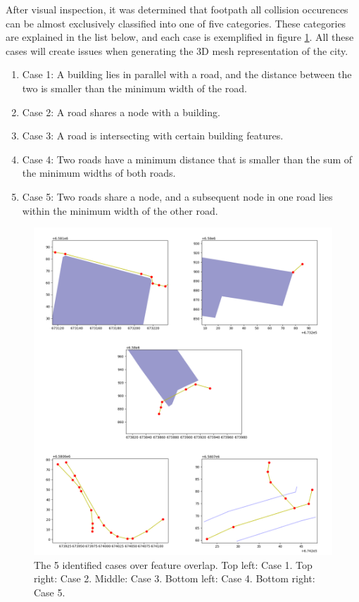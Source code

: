 \documentclass{kththesis}
\begin{document}
After visual inspection, it was determined that footpath all collision occurences can be almost exclusively classified into one of five categories.
These categories are explained in the list below, and each case is exemplified in figure \ref{fig:collision-cases}.
All these cases will create issues when generating the 3D mesh representation of the city.

\begin{enumerate}
\item Case 1: A building lies in parallel with a road, and the distance between the two is smaller than the minimum width of the road.
\item Case 2: A road shares a node with a building.
\item Case 3: A road is intersecting with certain building features.
\item Case 4: Two roads have a minimum distance that is smaller than the sum of the minimum widths of both roads. 
\item Case 5: Two roads share a node, and a subsequent node in one road lies within the minimum width of the other road.
\end{enumerate}

\begin{figure}[H]
    \centering
    \includegraphics[width=\textwidth,height=0.5\textheight,keepaspectratio]{img_feature_overlap_cases}
    \caption{The 5 identified cases over feature overlap. Top left: Case 1. Top right: Case 2. Middle: Case 3. Bottom left: Case 4. Bottom right: Case 5.}
    \label{fig:collision-cases}
\end{figure}
\end{document}
